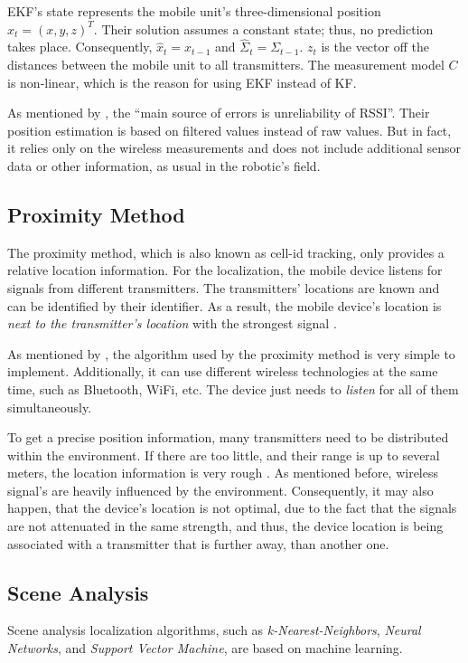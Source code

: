 \ac{EKF}'s state represents the mobile unit's three-dimensional position $x_t = (x, y, z)^T$. Their solution assumes a constant state; thus, no prediction takes place. Consequently, $\hat{x}_t = x_{t-1}$ and $\hat{\Sigma}_t = \Sigma_{t-1}$. $z_t$ is the vector off the distances between the mobile unit to all transmitters. The measurement model $C$ is non-linear, which is the reason for using \ac{EKF} instead of \ac{KF}.

As mentioned by \citet{kotanen:exp_local_pos_bt}, the ``main source of errors is unreliability of \ac{RSSI}''. Their position estimation is based on filtered values instead of raw values. But in fact, it relies only on the wireless measurements and does not include additional sensor data or other information, as usual in the robotic's field.


\subsection{Proximity Method}
The proximity method, which is also known as cell-id tracking, only provides a relative location information. For the localization, the mobile device listens for signals from different transmitters. The transmitters' locations are known and can be identified by their identifier. As a result, the mobile device's location is \emph{next to the transmitter's location} with the strongest signal \citep{IEEE:survey_wireless_indoor_pos, wang:bt_pos}.

As mentioned by \citet{IEEE:survey_wireless_indoor_pos}, the algorithm used by the proximity method is very simple to implement. Additionally, it can use different wireless technologies at the same time, such as Bluetooth, WiFi, etc. The device just needs to \emph{listen} for all of them simultaneously. 

To get a precise position information, many transmitters need to be distributed within the environment. If there are too little, and their range is up to several meters, the location information is very rough \citep{kotanen:exp_local_pos_bt}. As mentioned before, wireless signal's are heavily influenced by the environment. Consequently, it may also happen, that the device's location is not optimal, due to the fact that the signals are not attenuated in the same strength, and thus, the device location is being associated with a transmitter that is further away, than another one.


\subsection{Scene Analysis}\label{sec:fund_sceneanalysis}
Scene analysis localization algorithms, such as \emph{k-Nearest-Neighbors}, \emph{Neural Networks}, and \emph{Support Vector Machine}, are based on machine learning.

